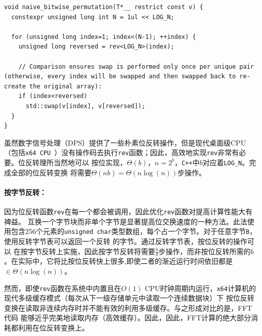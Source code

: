 \documentclass[10pt]{article}
\begin{document}
\begin{CJK*}{UTF8}{gbsn}
\begin{footnotesize}
\begin{lstlisting}[label={alg:simple-permutation},caption={{\bf 调用外部{\tt rev}函数实现位反转变换。}{\tt constexpr}（常量表达式，如编译时间）{\tt LOG\_N}为长度。函数{\tt rev}
 作为一个模板函数，参数为需要作反转操作数字的长度。}]
void naive_bitwise_permutation(T*__ restrict const v) {
  constexpr unsigned long int N = 1ul << LOG_N;

  for (unsigned long index=1; index<(N-1); ++index) {
    unsigned long reversed = rev<LOG_N>(index);

    // Comparison ensures swap is performed only once per unique pair (otherwise, every index will be swapped and then swapped back to re-create the original array):
    if (index<reversed)
      std::swap(v[index], v[reversed]);
  }
}
\end{lstlisting}
\end{footnotesize}

虽然数字信号处理（DPS）提供了一些朴素位反转操作，但是现代桌面级CPU（包括{\tt x64 CPU
}）没有操作码去执行{\tt rev}函数；因此，高效地实现{\tt rev}非常有必要。位反转理所当然地可以
按位实现，$\Theta(b)$，$n = 2^b$，{\tt C++}中$b$对应着{\tt LOG\_N}。完成全部的位反转变换
将需要$\Theta(n b) = \Theta(n \log(n))$步操作。


\paragraph{按字节反转：}
因为位反转函数{\tt rev}在每一个都会被调用，因此优化{\tt rev}函数对提高计算性能大有裨益。
互换一个字节块而非单个字节是显著提高位交换速度的一种方法。此法使用包含256个元素的{\tt unsigned char}类型数组，每个占一个字节。对于任意字节{\tt B}，使用反转字节表可以返回一个反转
的字节\cite{j:best, anderson:bit}。通过反转字节表，按位反转的操作可以
在按字节反转上实施，因此按字节反转将需要$\frac{b}{8}$步操作，而非按位反转所需的$b$。在实际中，它将比按位反转快上很多,即使二者的渐近运行时间依旧都是$\in \Theta(n \log(n))$。

然而，即使{\tt rev}函数在系统中内置且在$O(1)$ CPU时钟周期内运行，{\tt x64}计算机的
现代多级缓存模式（每次从下一级存储单元中读取一个连续数据块）下
按位反转变换在读取非连续内存时并不能有效的利用多级缓存。与之形成对比的是，FFT代码
能够近乎完美地读取内存（高效缓存）。因此，因此，FFT计算的绝大部分消耗都利用在位反转变换上。



\end{CJK*}
\end{document}
